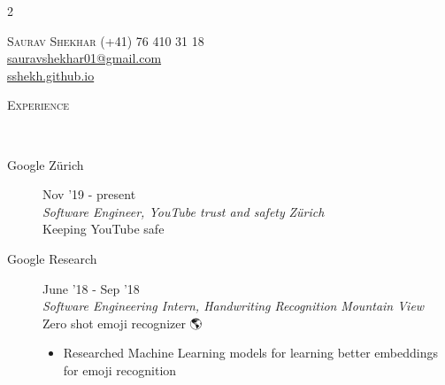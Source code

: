 \documentclass[9pt]{article}
\newenvironment{changemargin}[2]{%
  \begin{list}{}{%
      \setlength{\topsep}{0pt}%
    \setlength{\leftmargin}{#1}%
    \setlength{\rightmargin}{#2}%
    \setlength{\listparindent}{\parindent}%
  \setlength{\itemindent}{\parindent}%
    \setlength{\parsep}{\parskip}%
    }%
  \item[]}{\end{list}
    }
\newcommand{\lineover}{
  \begin{changemargin}{-0.05in}{-0.10in}
    \vspace*{-9pt}
    \hrulefill \\
    \vspace*{-2pt}
  \end{changemargin}
}
\newcommand{\header}[1]{
  \begin{changemargin}{-0.5in}{-0.5in}
    \scshape{#1}\\
        \lineover
  \end{changemargin}
}
\newcommand{\name}[1]{
  {\LARGE \scshape {#1}}
}
\newcommand{\contact}[4]{
  \begin{changemargin}{-0.65in}{-0.65in}
    \begin{multicols}{2}
      \name{{#1}}\vfill\null %
                        \columnbreak
                        {#2}\\	
                        {#3}\\ 
                        {#4}\\ 
    \end{multicols}
  \end{changemargin}
}
\newenvironment{body} {
  \vspace*{-16pt}
        \begin{changemargin}{-0.6in}{-0.65in}
        }	
        {\end{changemargin}
}
\begin{document}
\contact{Saurav Shekhar}
{{\hspace{172pt}}\faMobile (+41) 76 410 31 18}
{{\hspace{121pt}} \faEnvelope \href{mailto:sauravshekhar01@gmail.com}{sauravshekhar01@gmail.com}}
{{\hspace{177pt}} \faGithub \href{https://sshekh.github.io/}{sshekh.github.io}}  

\header{Experience}
\begin{body}
  \vspace{14pt}
  
  \begin{description}
    \item[\normalsize{Google Z{\"u}rich}] \hfill {Nov '19 - present} \\
      \textit{Software Engineer, YouTube trust and safety} \hfill \textit{Z{\"u}rich} \\
      Keeping YouTube \faYoutubePlay \hspace{2pt} safe
  \end{description}

  \begin{description}
    \item[Google Research] \hfill {June '18 - Sep '18} \\
    \textit{Software Engineering Intern, Handwriting Recognition} \hfill \textit{Mountain View}\\
  \normalsize{Zero shot emoji recognizer}  🌎
  \begin{itemize}
    \item Researched Machine Learning models for learning better embeddings for emoji recognition
  \end{itemize}
 \end{description}


\end{body}
\end{document}
